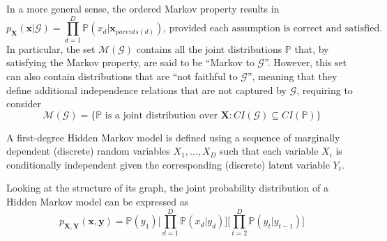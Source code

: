 \documentclass{report}
\begin{document}
\noindent In a more general sense, the ordered Markov property results in
\[p_{\mathbf{X}}(\mathbf{x}|\mathcal{G}) = \prod_{d = 1}^D \mathbb{P}(x_d|\mathbf{x}_{parents(d)}) \text{, provided each assumption is correct and satisfied.}\]
In particular, the set $\displaystyle \mathcal{M}(\mathcal{G})$ contains all the joint distributions $\displaystyle \mathbb{P}$ that, by satisfying the Markov property, are said to be ``Markov to $\displaystyle \mathcal{G}$''. \newline
However, this set can also contain distributions that are ``not faithful to $\displaystyle \mathcal{G}$'', meaning that they define additional independence relations that are not captured by $\displaystyle \mathcal{G}$, requiring to consider
\[\mathcal{M}(\mathcal{G}) = \{\mathbb{P} \text{ is a joint distribution over } \mathbf{X}: CI(\mathcal{G}) \subseteq CI(\mathbb{P})\}\]
\begin{examplebox}
    A first-degree Hidden Markov model is defined using a sequence of marginally dependent (discrete) random variables $\displaystyle X_1, \dots, X_D$ such that each variable $\displaystyle X_i$ is conditionally independent given the corresponding (discrete) latent variable $\displaystyle Y_i$.


    \noindent Looking at the structure of its graph, the joint probability distribution of a Hidden Markov model can be expressed as
    \[p_{\mathbf{X}, \mathbf{Y}}(\mathbf{x}, \mathbf{y}) = \mathbb{P}(y_1)\Bigg[\prod_{d = 1}^D \mathbb{P}(x_d|y_d)\Bigg]\Bigg[\prod_{t = 2}^D \mathbb{P}(y_t|y_{t - 1})\Bigg]\]
\end{examplebox}
\end{document}
